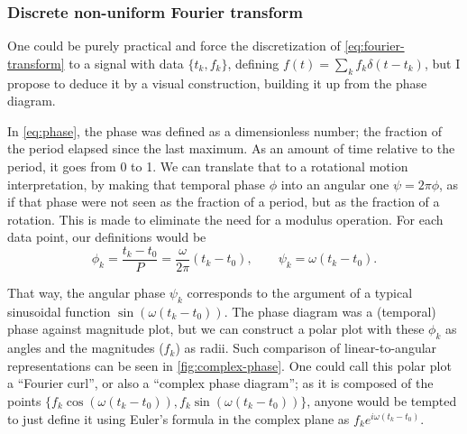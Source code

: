 	\subsubsection{Discrete non-uniform Fourier transform}
	
	One could be purely practical and force the discretization of \autoref{eq:fourier-transform} to a signal with data $\{t_k,f_k\}$,
	defining $f(t) = \sum_k f_k \delta(t-t_k)$, but I propose to deduce it by a visual construction, building it up from the phase diagram.
	
	In \autoref{eq:phase}, the phase was defined as a dimensionless number; the fraction of the period elapsed since the last maximum.
	As an amount of time relative to the period, it goes from 0 to 1.
	We can translate that to a rotational motion interpretation, by making that temporal phase $\phi$ into an angular one $\psi=2\pi \phi$,
	as if that phase were not seen as the fraction of a period, but as the fraction of a rotation.
	This is made to eliminate the need for a modulus operation. For each data point, our definitions would be
	$$
	\phi_k = \frac{t_k-t_0}{P} = \frac{\omega}{2\pi}(t_k-t_0), \qquad \psi_k = \omega(t_k-t_0).
	$$
	
	That way, the angular phase $\psi_k$ corresponds to the argument of a typical sinusoidal function $\sin(\omega(t_k-t_0))$.
	The phase diagram was a (temporal) phase against magnitude plot, but we can construct a polar plot with these $\phi_k$ as angles and the magnitudes ($f_k$) as radii.
	Such comparison of linear-to-angular representations can be seen in \autoref{fig:complex-phase}.
	One could call this polar plot a \enquote{Fourier curl}, or also a \enquote{complex phase diagram};
	as it is composed of the points $\{f_k \cos(\omega(t_k-t_0)),f_k \sin(\omega(t_k-t_0))\}$, 
	anyone would be tempted to just define it using Euler's formula in the complex plane as $f_k e^{i \omega (t_k-t_0)}$.
	
